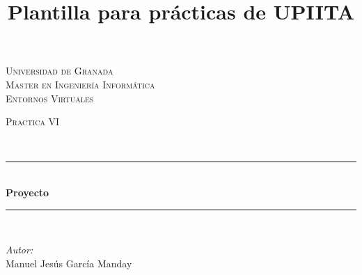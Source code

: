 \documentclass[10pt]{article}
\title{Plantilla para prácticas de UPIITA}
\begin{document}
\begin{center}																		%
\newcommand{\HRule}{\rule{\linewidth}{0.5mm}}									%
\begin{minipage}{0.48\textwidth} \begin{flushleft}
\end{flushleft}\end{minipage}
\begin{minipage}{0.48\textwidth} \begin{flushright}
\end{flushright}\end{minipage}

\vspace*{0.25cm}								%
\textsc{\huge Universidad de Granada}\\[1.5cm]	

\textsc{\LARGE Master en Ingeniería Informática}\\[1.5cm]													%

\textsc{\LARGE Entornos Virtuales}\\[1.5cm]													%

\begin{minipage}{0.9\textwidth} 
\begin{center}																					%
\textsc{\LARGE Practica VI}
\end{center}
\end{minipage}\\[0.5cm]
 			\vspace*{1cm}																		%
\HRule \\[0.4cm]																	%
{ \huge \bfseries Proyecto}\\[0.4cm]	%
\HRule \\[1.5cm]																	%
\begin{minipage}{0.46\textwidth}													%
\begin{flushleft} \large															%
\emph{Autor:}\\	
 Manuel Jesús García Manday
\end{flushleft}																		%
\end{minipage}		
\begin{minipage}{0.52\textwidth}		
\vspace{-0.6cm}											%
\begin{flushright} \large															%
\end{flushright}																	%
\end{minipage}	
\vspace*{1cm}
 	

\end{center}
\end{document}
